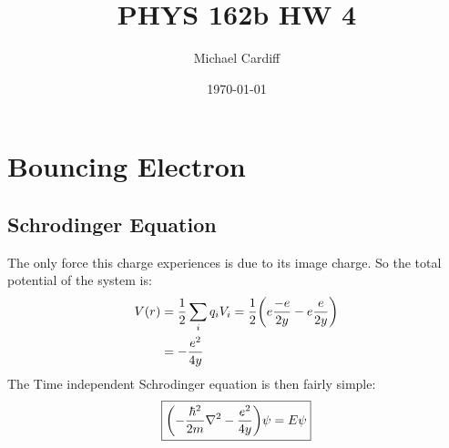 \documentclass[12pt]{article}
\title{\vspace{-3em}PHYS 162b HW 4}
\author{Michael Cardiff}
\date{\today}
\begin{document}
\maketitle

\section{Bouncing Electron}

\subsection{Schrodinger Equation}
The only force this charge experiences is due to its image charge. So the total potential of the system is:
\begin{align*}
  V(r)&=\frac12\sum_iq_iV_i=\frac12\qty(e\frac{-e}{2y}-e\frac{e}{2y})\\
  &=-\frac{e^2}{4y}
\end{align*}
The Time independent Schrodinger equation is then fairly simple:
\begin{align}
  \boxed{\qty(-\frac{\hbar^2}{2m}\laplacian-\frac{e^2}{4y})\psi=E\psi}
\end{align}
\end{document}
